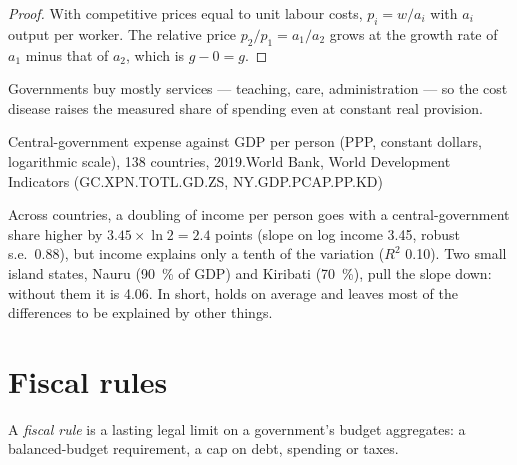 \begin{proof}
With competitive prices equal to unit labour costs, $p_i = w/a_i$ with $a_i$ output per
worker. The relative price $p_2/p_1 = a_1/a_2$ grows at the growth rate of $a_1$ minus that of $a_2$,
which is $g - 0 = g$.
\end{proof}

Governments buy mostly services --- teaching, care, administration --- so the cost
disease raises the measured share of spending even at constant real provision.

\begin{omchart}{Central-government expense against GDP per person (PPP, constant
dollars, logarithmic scale), 138 countries, 2019.}{World Bank, World Development
Indicators (GC.XPN.TOTL.GD.ZS, NY.GDP.PCAP.PP.KD)}
\end{omchart}

Across countries, a doubling of income per person goes with a central-government
share higher by $3.45 \times \ln 2 = 2.4$ points (slope on log income 3.45, robust s.e.\ 0.88), but income
explains only a tenth of the variation ($R^2$ 0.10). Two small island states, Nauru
(90~\% of GDP) and Kiribati (70~\%), pull the slope down: without them it is 4.06.
In short,  holds on average and
leaves most of the differences to be explained by other things.

\section{Fiscal rules}\label{sec:b3:public-choice-voting:rules}

\begin{definition}\label{def:b3:public-choice-voting:fiscal-rule}
A \emph{fiscal rule} is a lasting legal limit on a government's budget aggregates:
a balanced-budget requirement, a cap on debt, spending or taxes.
\end{definition}


